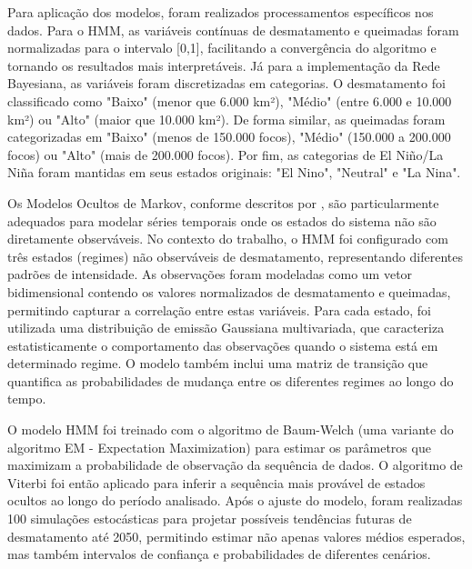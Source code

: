 \documentclass[12pt,a4paper]{article}
\begin{document}
Para aplicação dos modelos, foram realizados processamentos específicos nos dados. Para o HMM, as variáveis contínuas de desmatamento e queimadas foram normalizadas para o intervalo [0,1], facilitando a convergência do algoritmo e tornando os resultados mais interpretáveis. Já para a implementação da Rede Bayesiana, as variáveis foram discretizadas em categorias. O desmatamento foi classificado como "Baixo" (menor que 6.000 km²), "Médio" (entre 6.000 e 10.000 km²) ou "Alto" (maior que 10.000 km²). De forma similar, as queimadas foram categorizadas em "Baixo" (menos de 150.000 focos), "Médio" (150.000 a 200.000 focos) ou "Alto" (mais de 200.000 focos). Por fim, as categorias de El Niño/La Niña foram mantidas em seus estados originais: "El Nino", "Neutral" e "La Nina".

Os Modelos Ocultos de Markov, conforme descritos por \citet{hmm}, são particularmente adequados para modelar séries temporais onde os estados do sistema não são diretamente observáveis. No contexto do trabalho, o HMM foi configurado com três estados (regimes) não observáveis de desmatamento, representando diferentes padrões de intensidade. As observações foram modeladas como um vetor bidimensional contendo os valores normalizados de desmatamento e queimadas, permitindo capturar a correlação entre estas variáveis. Para cada estado, foi utilizada uma distribuição de emissão Gaussiana multivariada, que caracteriza estatisticamente o comportamento das observações quando o sistema está em determinado regime. O modelo também inclui uma matriz de transição que quantifica as probabilidades de mudança entre os diferentes regimes ao longo do tempo.

O modelo HMM foi treinado com o algoritmo de Baum-Welch (uma variante do algoritmo EM - Expectation Maximization) para estimar os parâmetros que maximizam a probabilidade de observação da sequência de dados. O algoritmo de Viterbi foi então aplicado para inferir a sequência mais provável de estados ocultos ao longo do período analisado. Após o ajuste do modelo, foram realizadas 100 simulações estocásticas para projetar possíveis tendências futuras de desmatamento até 2050, permitindo estimar não apenas valores médios esperados, mas também intervalos de confiança e probabilidades de diferentes cenários.
\end{document}
